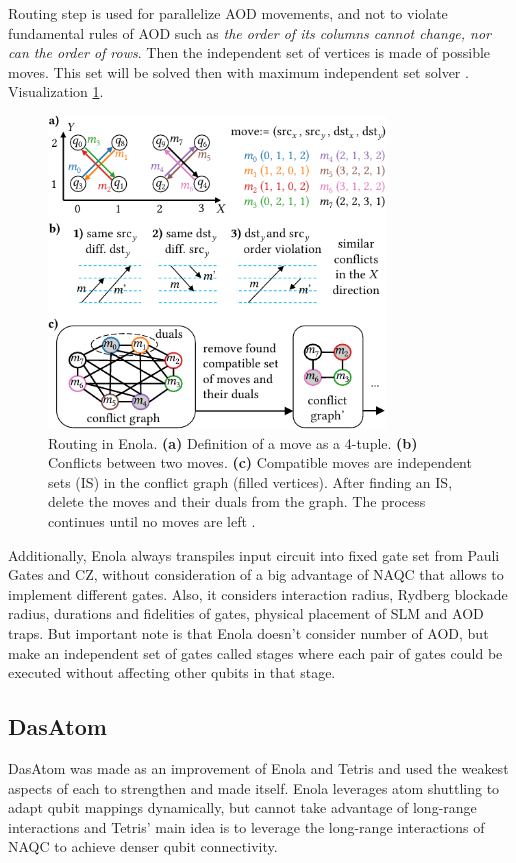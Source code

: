 Routing step is used for parallelize \ac{AOD} movements, 
and not to violate fundamental rules of \ac{AOD} such as \textit{the order of its columns cannot change, nor can
the order of rows}.
Then the independent set of vertices is made of possible moves. 
This set will be solved then with maximum independent set solver \parencite{Tan_2025_Enola}.
Visualization \ref{fig:routing_Enola}.
\begin{figure}[htbp]
  \centering
    \includegraphics[width=0.8\textwidth]{figures/routing_Enola.pdf}
    \caption{Routing in Enola. 
    \textbf{(a)} Definition of a move as a 4-tuple. 
    \textbf{(b)} Conflicts between two moves. 
    \textbf{(c)} Compatible moves are independent sets (IS) in the conflict graph (filled vertices).
    After finding an IS, delete the moves and their duals from
    the graph. The process continues until no moves are left \parencite{Tan_2025_Enola}.}
    \label{fig:routing_Enola}
\end{figure}

Additionally, Enola always transpiles input circuit into fixed gate set from Pauli Gates and CZ, 
without consideration of a big advantage of \ac{NAQC} that allows to implement different gates.
Also, it considers interaction radius, Rydberg blockade radius, durations and fidelities of gates,
physical placement of \ac{SLM} and \ac{AOD} traps. 
But important note is that Enola doesn't consider number of \ac{AOD}, 
but make an independent set of gates called stages where each pair of gates could be executed without affecting other qubits in that stage.

\subsection{DasAtom}
DasAtom was made as an improvement of Enola and Tetris 
and used the weakest aspects of each to strengthen and made itself.
Enola leverages atom shuttling to adapt qubit mappings dynamically,
but cannot take advantage of long-range interactions
and Tetris' main idea is to leverage the long-range interactions of \ac{NAQC} 
to achieve denser qubit connectivity\parencite{10082942, huang2025dasatomdivideandshuttleatomapproach}.

